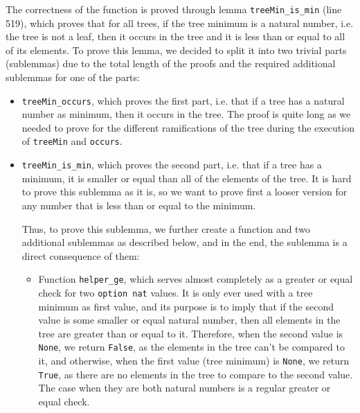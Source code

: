 \documentclass[a4paper]{article}
\begin{document}
The correctness of the function is proved through lemma \texttt{treeMin\_is\_min} (line 519), which proves that for all trees, if the tree minimum is a natural number, i.e. the tree is not a leaf, then it occurs in the tree and it is less than or equal to all of its elements. To prove this lemma, we decided to split it into two trivial parts (sublemmas) due to the total length of the proofs and the required additional sublemmas for one of the parts:

\begin{itemize}
    \item \texttt{treeMin\_occurs}, which proves the first part, i.e. that if a tree has a natural number as minimum, then it occurs in the tree. The proof is quite long as we needed to prove for the different ramifications of the tree during the execution of \texttt{treeMin} and \texttt{occurs}.
    
    
    \item \texttt{treeMin\_is\_min}, which proves the second part, i.e. that if a tree has a minimum, it is smaller or equal than all of the elements of the tree. It is hard to prove this sublemma as it is, so we want to prove first a looser version for any number that is less than or equal to the minimum.
    
    
    
    Thus, to prove this sublemma, we further create a function and two additional sublemmas as described below, and in the end, the sublemma is a direct consequence of them:
    \begin{itemize}
        \item Function \texttt{helper\_ge}, which serves almost completely as a greater or equal check for two \texttt{option nat} values. It is only ever used with a tree minimum as first value, and its purpose is to imply that if the second value is some smaller or equal natural number, then all elements in the tree are greater than or equal to it. Therefore, when the second value is \texttt{None}, we return \texttt{False}, as the elements in the tree can't be compared to it, and otherwise, when the first value (tree minimum) is \texttt{None}, we return \texttt{True}, as there are no elements in the tree to compare to the second value. The case when they are both natural numbers is a regular greater or equal check.
        
        

\end{itemize}
\end{itemize}
\end{document}
